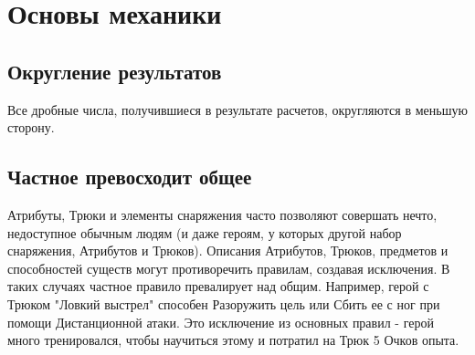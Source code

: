 \chapter{Основы механики}







\section{Округление результатов}
Все дробные числа, получившиеся в результате расчетов, округляются в меньшую сторону.

\section{Частное превосходит общее}
Атрибуты, Трюки и элементы снаряжения часто позволяют совершать нечто, недоступное обычным людям (и даже героям, у которых другой набор снаряжения, Атрибутов и Трюков). Описания Атрибутов, Трюков, предметов и способностей существ могут противоречить правилам, создавая исключения. В таких случаях частное правило превалирует над общим. Например, герой с Трюком "Ловкий выстрел" способен Разоружить цель или Сбить ее с ног при помощи Дистанционной атаки. Это исключение из основных правил - герой много тренировался, чтобы научиться этому и потратил на Трюк 5 Очков опыта.






%

